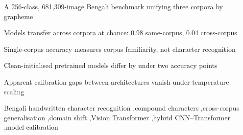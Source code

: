 \documentclass[5p,10pt]{elsarticle}
\begin{document}
\begin{frontmatter}
\begin{highlights}
\item A 256-class, 681,309-image Bengali benchmark unifying three corpora by grapheme
\item Models transfer across corpora at chance: 0.98 same-corpus, 0.04 cross-corpus
\item Single-corpus accuracy measures corpus familiarity, not character recognition
\item Clean-initialised pretrained models differ by under two accuracy points
\item Apparent calibration gaps between architectures vanish under temperature scaling
\end{highlights}

\begin{keyword}
Bengali handwritten character recognition \sep compound characters \sep cross-corpus generalisation \sep domain shift \sep Vision Transformer \sep hybrid CNN--Transformer \sep model calibration
\end{keyword}

\end{frontmatter}




\end{document}

